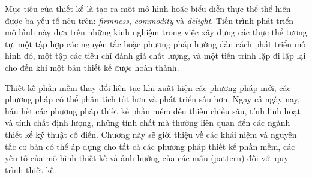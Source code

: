 \documentclass[12pt, a4paper]{article}
\begin{document}
	Mục tiêu của thiết kế là tạo ra một mô hình hoặc biểu diễn thực thể thể hiện được ba yếu tố nêu trên: \textit{firmness}, \textit{commodity} và \textit{delight}. Tiến trình phát triển mô hình này dựa trên những kinh nghiệm trong việc xây dựng các thực thể tương tự, một tập hợp các nguyên tắc hoặc phương pháp hướng dẫn cách phát triển mô hình đó, một tập các tiêu chí đánh giá chất lượng, và một tiến trình lặp đi lặp lại cho đến khi một bản thiết kế được hoàn thành.
	
	
	Thiết kế phần mềm thay đổi liên tục khi xuất hiện các phương pháp mới, các phương pháp có thể phân tích tốt hơn và phát triển sâu hơn. Ngay cả ngày nay, hầu hết các phương pháp thiết kế phần mềm đều thiếu chiều sâu, tính linh hoạt và tính chất định lượng, những tính chất mà thường liên quan đến các ngành thiết kế kỹ thuật cổ điển. Chương này sẽ giới thiệu về các khái niệm và nguyên tắc cơ bản có thể áp dụng cho tất cả các phương pháp thiết kế phần mềm, các yếu tố của mô hình thiết kế và ảnh hưởng của các mẫu (pattern) đối với quy trình thiết kế.

	
	
	
	
	
	
	
	
	\clearpage
	
	
	\clearpage
	
	\nocite{*}
	\printbibliography[heading=bibintoc, title=Tài liệu tham khảo]
	\printindex
	
\end{document}
